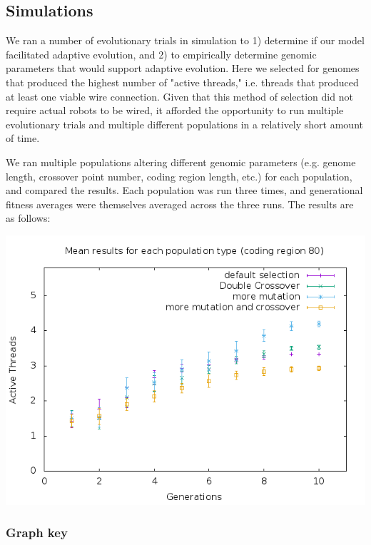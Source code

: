 \documentclass[11pt]{article}
\begin{document}
\subsection*{Simulations}
\label{sec:orgheadline32}

We ran a number of evolutionary trials in simulation to 1) determine if our model facilitated adaptive evolution, and 2) to empirically determine genomic parameters that would support adaptive evolution. Here we selected for genomes that produced the highest number of "active threads," i.e. threads that produced at least one viable wire connection. Given that this method of selection did not require actual robots to be wired, it afforded the opportunity to run multiple evolutionary trials and multiple different populations in a relatively short amount of time. 

We ran multiple populations altering different genomic parameters (e.g. genome length, crossover point number, coding region length, etc.) for each population, and compared the results. Each population was run three times, and generational fitness averages were themselves averaged across the three runs. The results are as follows:

\includegraphics[width=.9\linewidth]{population-comparison-80-1.png}

\subsubsection*{Graph key}
\label{sec:orgheadline26}
\end{document}
